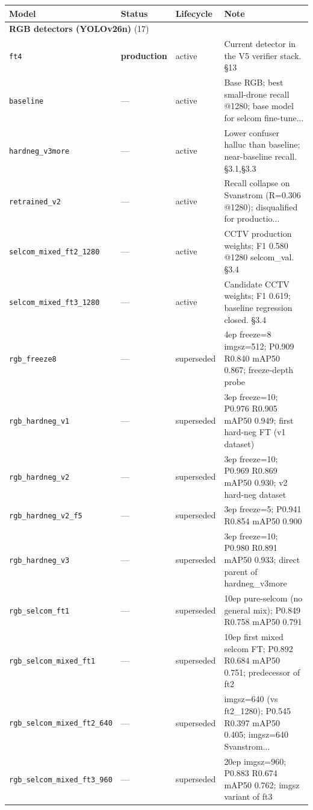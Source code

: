 \footnotesize
\begin{longtable}{p{}llp{}}
\toprule
Model & Status & Lifecycle & Note \\
\midrule
\endhead
\multicolumn{4}{l}{\textbf{RGB detectors (YOLOv26n)} (17)} \\
\midrule
\texttt{ft4} & \textbf{production} & active & Current detector in the V5 verifier stack. §13 \\
\texttt{baseline} & --- & active & Base RGB; best small-drone recall @1280; base model for selcom fine-tune... \\
\texttt{hardneg\_v3more} & --- & active & Lower confuser halluc than baseline; near-baseline recall. §3.1,§3.3 \\
\texttt{retrained\_v2} & --- & active & Recall collapse on Svanstrom (R=0.306 @1280); disqualified for productio... \\
\texttt{selcom\_mixed\_ft2\_1280} & --- & active & CCTV production weights; F1 0.580 @1280 selcom\_val. §3.4 \\
\texttt{selcom\_mixed\_ft3\_1280} & --- & active & Candidate CCTV weights; F1 0.619; baseline regression closed. §3.4 \\
\texttt{rgb\_freeze8} & --- & superseded & 4ep freeze=8 imgsz=512; P0.909 R0.840 mAP50 0.867; freeze-depth probe \\
\texttt{rgb\_hardneg\_v1} & --- & superseded & 3ep freeze=10; P0.976 R0.905 mAP50 0.949; first hard-neg FT (v1 dataset) \\
\texttt{rgb\_hardneg\_v2} & --- & superseded & 3ep freeze=10; P0.969 R0.869 mAP50 0.930; v2 hard-neg dataset \\
\texttt{rgb\_hardneg\_v2\_f5} & --- & superseded & 3ep freeze=5; P0.941 R0.854 mAP50 0.900 \\
\texttt{rgb\_hardneg\_v3} & --- & superseded & 3ep freeze=10; P0.980 R0.891 mAP50 0.933; direct parent of hardneg\_v3more \\
\texttt{rgb\_selcom\_ft1} & --- & superseded & 10ep pure-selcom (no general mix); P0.849 R0.758 mAP50 0.791 \\
\texttt{rgb\_selcom\_mixed\_ft1} & --- & superseded & 10ep first mixed selcom FT; P0.892 R0.684 mAP50 0.751; predecessor of ft2 \\
\texttt{rgb\_selcom\_mixed\_ft2\_640} & --- & superseded & imgsz=640 (vs ft2\_1280); P0.545 R0.397 mAP50 0.405; imgsz=640 Svanstrom... \\
\texttt{rgb\_selcom\_mixed\_ft3\_960} & --- & superseded & 20ep imgsz=960; P0.883 R0.674 mAP50 0.762; imgsz variant of ft3 \\

\end{longtable}
